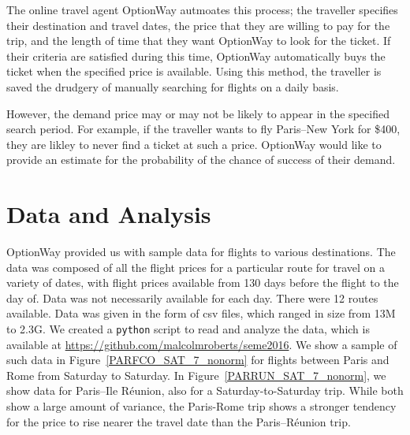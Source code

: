 \documentclass{article}
\begin{document}
The online travel agent OptionWay autmoates this process; the
traveller specifies their destination and travel dates, the price that
they are willing to pay for the trip, and the length of time that they
want OptionWay to look for the ticket.  If their criteria are
satisfied during this time, OptionWay automatically buys the ticket
when the specified price is available.  Using this method, the
traveller is saved the drudgery of manually searching for flights on a
daily basis.

However, the demand price may or may not be likely to appear in the
specified search period.  For example, if the traveller wants to fly
Paris--New York for \$400, they are likley to never find a ticket at
such a price.  OptionWay would like to provide an estimate for the
probability of the chance of success of their demand.

\section{Data and Analysis}

OptionWay provided us with sample data for flights to various
destinations.  The data was composed of all the flight prices for a
particular route for travel on a variety of dates, with flight prices
available from 130 days before the flight to the day of.  Data was not
necessarily available for each day.  There were 12 routes available.
Data was given in the form of csv files, which ranged in size from 13M
to 2.3G.  We created a \texttt{python} script to read and analyze the
data, which is available at
\url{https://github.com/malcolmroberts/seme2016}.  We show a sample of
such data in Figure~\ref{PARFCO_SAT_7_nonorm} for flights between
Paris and Rome from Saturday to Saturday.  In
Figure~\ref{PARRUN_SAT_7_nonorm}, we show data for Paris--Ile Réunion,
also for a Saturday-to-Saturday trip.  While both show a large amount
of variance, the Paris-Rome trip shows a stronger tendency for the
price to rise nearer the travel date than the Paris--Réunion trip.
\end{document}
